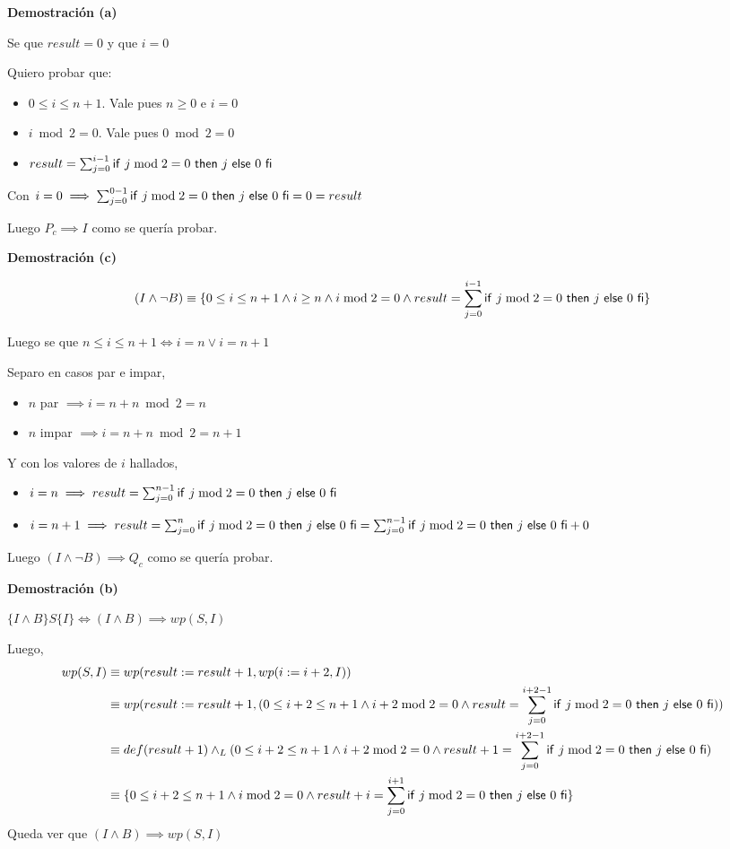 \textbf{Demostración (a)}

Se que $result = 0 $ y que $ i = 0 $

Quiero probar que:
\begin{itemize}
    \item $ 0 \leq i \leq n+1 $. Vale pues $n \geq 0$ e $ i = 0 $
    \item $ i \bmod 2 = 0 $. Vale pues $ 0 \bmod 2 = 0 $
    \item $ result = \sum_{j = 0}^{i-1}\mathsf{if}\ j \bmod 2 = 0\ \mathsf{then}\ j\ \mathsf{else}\ 0\ \mathsf{fi} $
\end{itemize}

Con $ i = 0 \implies \sum_{j = 0}^{0-1}\mathsf{if}\ j \bmod 2 = 0\ \mathsf{then}\ j\ \mathsf{else}\ 0\ \mathsf{fi} = 0= result $

Luego $ P_c \implies I $ como se quería probar.

\textbf{Demostración (c)}

\begin{align*}
    (I \wedge \neg B) \equiv \{ 0 \leq i \leq n+1 \wedge i\geq n \wedge i \bmod 2 = 0 \wedge result = \sum_{j = 0}^{i-1}\mathsf{if}\ j \bmod 2 = 0\ \mathsf{then}\ j\ \mathsf{else}\ 0\ \mathsf{fi}  \}
\end{align*}

Luego se que $ n \leq i \leq n+1 \iff i =n \vee i = n+1 $

Separo en casos par e impar,
\begin{itemize}
    \item $ n$ par $\implies i = n+n \bmod 2 = n $
    \item $ n$ impar $\implies i = n+n \bmod 2 = n+1 $
\end{itemize}

Y con los valores de $i$ hallados,
\begin{itemize}
    \item $ i = n \implies result = \sum_{j = 0}^{n-1}\mathsf{if}\ j \bmod 2 = 0\ \mathsf{then}\ j\ \mathsf{else}\ 0\ \mathsf{fi} $
    \item $ i = n + 1 \implies result = \sum_{j = 0}^{n}\mathsf{if}\ j \bmod 2 = 0\ \mathsf{then}\ j\ \mathsf{else}\ 0\ \mathsf{fi} = \sum_{j = 0}^{n-1}\mathsf{if}\ j \bmod 2 = 0\ \mathsf{then}\ j\ \mathsf{else}\ 0\ \mathsf{fi} + 0 $
\end{itemize}

Luego $ (I \wedge \neg B) \implies Q_c $ como se quería probar.

\textbf{Demostración (b)}

$ \{ I \wedge B \} S \{ I \} \iff (I \wedge B) \implies wp(S, I) $

Luego,
\begin{align*}
    wp(S, I) &\equiv wp(result := result + 1, wp(i := i+2, I)) \\
    &\equiv wp(result := result + 1, (0 \leq i+2 \leq n+1 \wedge i+2 \bmod 2 = 0\wedge result = \sum_{j = 0}^{i+2-1}\mathsf{if}\ j \bmod 2 = 0\ \mathsf{then}\ j\ \mathsf{else}\ 0\ \mathsf{fi})) \\
    &\equiv def(result + 1) \land _L (0 \leq i+2 \leq n+1 \wedge i+2 \bmod 2 = 0\wedge result + 1 = \sum_{j = 0}^{i+2-1}\mathsf{if}\ j \bmod 2 = 0\ \mathsf{then}\ j\ \mathsf{else}\ 0\ \mathsf{fi}) \\
    &\equiv \{ 0 \leq i+2 \leq n+1 \wedge i \bmod 2 = 0\wedge result + i = \sum_{j = 0}^{i+1}\mathsf{if}\ j \bmod 2 = 0\ \mathsf{then}\ j\ \mathsf{else}\ 0\ \mathsf{fi} \} \\
\end{align*}
Queda ver que $ (I \wedge B) \implies wp(S, I) $

